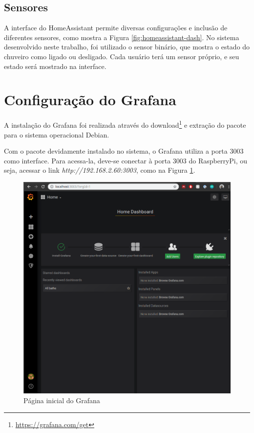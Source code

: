 \subsection{Sensores}

A interface do HomeAssistant permite diversas configurações e inclusão de diferentes sensores, como mostra a Figura \ref{fig:homeassistant-dash}. No sistema desenvolvido neste trabalho, foi utilizado o sensor binário, que mostra o estado do chuveiro como ligado ou desligado. Cada usuário terá um sensor próprio, e seu estado será mostrado na interface.


\section{Configuração do Grafana}

A instalação do Grafana foi realizada através do download\footnote{\url{https://grafana.com/get}} e extração do pacote para o sistema operacional Debian.

Com o pacote devidamente instalado no sistema, o Grafana utiliza a porta 3003 como interface. Para acessa-la, deve-se conectar à porta 3003 do RaspberryPi, ou seja, acessar o link \textit{http://192.168.2.60:3003}, como na Figura \ref{fig:grafanahome}.

\begin{figure}[htbp]
	\centering
	\includegraphics[width=1\linewidth]{figuras/grafanahome.png}
	\caption{Página inicial do Grafana}
	\label{fig:grafanahome}
\end{figure}


